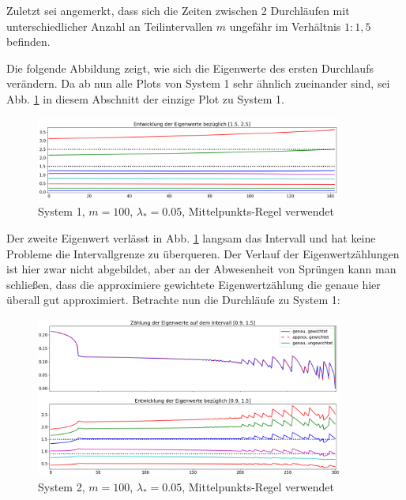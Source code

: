 \documentclass[a4paper,12pt]{report}
\newcommand{\1}{\mathds{1}}
\theoremstyle{plain} %
\theoremstyle{definition} %
\theoremstyle{remark}
\begin{document}
            Zuletzt sei angemerkt, dass sich die Zeiten zwischen 2 Durchläufen mit unterschiedlicher Anzahl an Teilintervallen $m$ ungefähr im Verhältnis $1:1,5$ befinden.

            Die folgende Abbildung zeigt, wie sich die Eigenwerte des ersten Durchlaufs verändern. Da ab nun alle Plots von System 1 sehr ähnlich zueinander sind,
            sei Abb. \ref{fig: Plot_1_100_0.05_Mittelpunkt} in diesem Abschnitt der einzige Plot zu System 1.

            \begin{figure}[ht]
                  \centering
                  \includegraphics[width=0.9\textwidth, keepaspectratio]{./Mittelpunkt/Plot_1_100_0.05.png}
                  \caption{System 1, $m=100$, $\lambda_*=0.05$, Mittelpunkts-Regel verwendet}
                  \label{fig: Plot_1_100_0.05_Mittelpunkt}
            \end{figure}

            Der zweite Eigenwert verlässt in Abb. \ref{fig: Plot_1_100_0.05_Mittelpunkt} langsam das Intervall und hat keine Probleme die Intervallgrenze zu überqueren.
            Der Verlauf der Eigenwertzählungen ist hier zwar nicht abgebildet, aber an der Abwesenheit von Sprüngen kann man schließen, dass die approximiere gewichtete Eigenwertzählung die genaue hier überall gut approximiert. 
            Betrachte nun die Durchläufe zu System 1:

            \begin{figure}[h!t]
                  \centering
                  \includegraphics[width=0.9\textwidth, keepaspectratio]{./Mittelpunkt/Plot_2_100_0.05.png}
                  \caption[System 2, $m=100$, $\lambda_*=0.05$, Mittelpunkts-Regel]{System 2, $m=100$, $\lambda_*=0.05$, Mittelpunkts-Regel verwendet}
                  \label{fig: Plot_2_100_0.05_Mittelpunkt}
            \end{figure}
\end{document}
